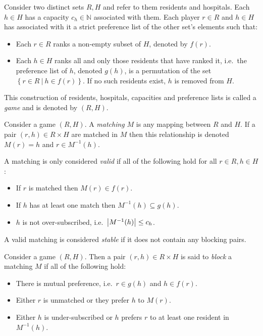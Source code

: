 \begin{definition}\label{def:game}
    Consider two distinct sets \(R, H\) and refer to them residents and
    hospitals. Each \(h \in H\) has a capacity \(c_h \in \mathbb{N}\) associated
    with them. Each player \(r \in R\) and \(h \in H\) has associated 
    with it a strict preference list of the other set's elements such that:
    \begin{itemize}
        \item Each \(r \in R\) ranks a non-empty subset of \(H\), denoted by
            \(f(r)\).
        \item Each \(h \in H\) ranks all and only those residents that have
            ranked it, i.e.\ the preference list of \(h\), denoted \(g(h)\), is
            a permutation of the set
            \(\left\{r \in R \ | \ h \in f(r)\right\}\). If no such residents
            exist, \(h\) is removed from \(H\).
    \end{itemize}

    This construction of residents, hospitals, capacities and preference lists
    is called a \emph{game} and is denoted by \((R, H)\).
\end{definition}

\begin{definition}\label{def:matching}
    Consider a game \((R, H)\). A \emph{matching} \(M\) is any mapping between
    \(R\) and \(H\). If a pair \((r, h) \in R \times H\) are matched in \(M\)
    then this relationship is denoted \(M(r) = h\) and \(r \in M^{-1}(h)\).

    A matching is only considered \emph{valid} if all of the following hold for
    all \(r \in R, h \in H\):
    \begin{itemize}
        \item If \(r\) is matched then \(M(r) \in f(r)\).
        \item If \(h\) has at least one match then \(M^{-1}(h) \subseteq g(h)\).
        \item \(h\) is not over-subscribed, i.e.\ \(\abs*{M^{-1}(h)} \leq c_h\).
    \end{itemize}

    A valid matching is considered \emph{stable} if it does not contain any
    blocking pairs.
\end{definition}

\begin{definition}\label{def:blocking}
    Consider a game \((R, H)\). Then a pair \((r, h) \in R \times H\) is said to
    \emph{block} a matching \(M\) if all of the following hold:
    \begin{itemize}
        \item There is mutual preference, i.e.\ \(r \in g(h)\) and \(h \in
            f(r)\).
        \item Either \(r\) is unmatched or they prefer \(h\) to \(M(r)\).
        \item Either \(h\) is under-subscribed or \(h\) prefers \(r\) to at
            least one resident in \(M^{-1}(h)\).
    \end{itemize}
\end{definition}

